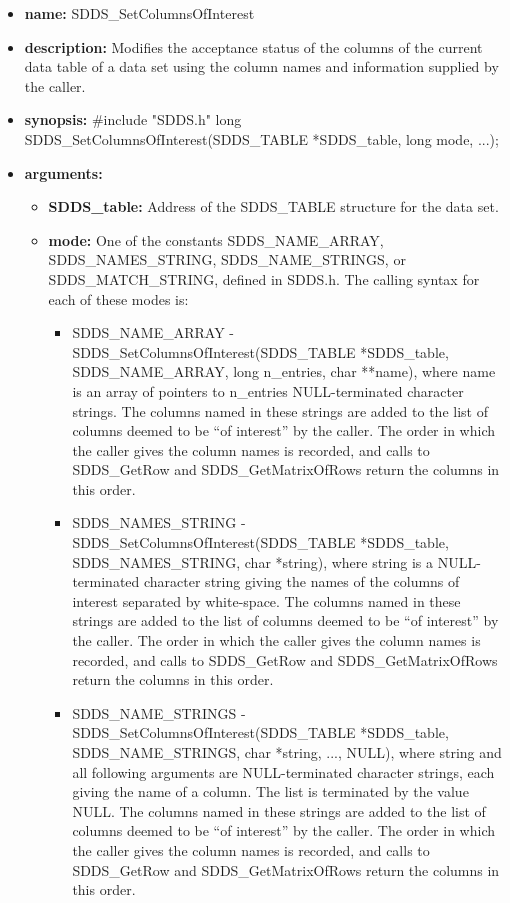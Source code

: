 \documentclass[11pt]{article}
\begin{document}
\begin{itemize}
\item {\bf name:}\newline
SDDS\_SetColumnsOfInterest
\item {\bf description:}\newline
Modifies the acceptance status of the columns of the current data table of a data set using the column names and information supplied by the caller.
\item {\bf synopsis:} \#include "SDDS.h"\newline
long SDDS\_SetColumnsOfInterest(SDDS\_TABLE *SDDS\_table, long mode, ...);
\item {\bf arguments:}
\begin{itemize}
\item {\bf SDDS\_table:} Address of the SDDS\_TABLE structure for the data set.
\item {\bf mode:} One of the constants SDDS\_NAME\_ARRAY, SDDS\_NAMES\_STRING, SDDS\_NAME\_STRINGS, or SDDS\_MATCH\_STRING, defined in  SDDS.h. The calling syntax for each of these modes is:
\begin{itemize}
\item SDDS\_NAME\_ARRAY - SDDS\_SetColumnsOfInterest(SDDS\_TABLE *SDDS\_table, SDDS\_NAME\_ARRAY, long n\_entries, char **name), where name is an array of pointers to n\_entries NULL-terminated character strings. The columns named in these strings are added to the list of columns deemed to be ``of interest'' by the caller. The order in which the caller gives the column names is recorded, and calls to SDDS\_GetRow and SDDS\_GetMatrixOfRows return the columns in this order. 
\item SDDS\_NAMES\_STRING - SDDS\_SetColumnsOfInterest(SDDS\_TABLE *SDDS\_table, SDDS\_NAMES\_STRING, char *string), where string is a NULL-terminated character string giving the names of the columns of interest separated by white-space. The columns named in these strings are added to the list of columns deemed to be ``of interest'' by the caller. The order in which the caller gives the column names is recorded, and calls to SDDS\_GetRow and SDDS\_GetMatrixOfRows return the columns in this order. 
\item SDDS\_NAME\_STRINGS - SDDS\_SetColumnsOfInterest(SDDS\_TABLE *SDDS\_table, SDDS\_NAME\_STRINGS, char *string, ..., NULL), where string and all following arguments are NULL-terminated character strings, each giving the name of a column. The list is terminated by the value NULL. The columns named in these strings are added to the list of columns deemed to be ``of interest'' by the caller. The order in which the caller gives the column names is recorded, and calls to SDDS\_GetRow and SDDS\_GetMatrixOfRows return the columns in this order. 

\end{itemize}
\end{itemize}
\end{itemize}
\end{document}
